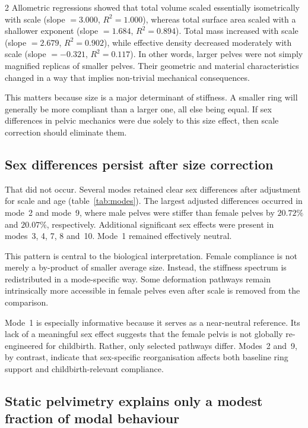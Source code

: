 \documentclass[openacc]{rsproca_new}
\begin{document}
\begin{multicols}{2}
Allometric regressions showed that total volume scaled essentially isometrically with scale (slope $=3.000$, $R^2=1.000$), whereas total surface area scaled with a shallower exponent (slope $=1.684$, $R^2=0.894$). Total mass increased with scale (slope $=2.679$, $R^2=0.902$), while effective density decreased moderately with scale (slope $=-0.321$, $R^2=0.117$). In other words, larger pelves were not simply magnified replicas of smaller pelves. Their geometric and material characteristics changed in a way that implies non-trivial mechanical consequences.

This matters because size is a major determinant of stiffness. A smaller ring will generally be more compliant than a larger one, all else being equal. If sex differences in pelvic mechanics were due solely to this size effect, then scale correction should eliminate them.

\subsection{Sex differences persist after size correction}

That did not occur. Several modes retained clear sex differences after adjustment for scale and age (table~\ref{tab:modes}). The largest adjusted differences occurred in mode~2 and mode~9, where male pelves were stiffer than female pelves by $20.72\%$ and $20.07\%$, respectively. Additional significant sex effects were present in modes~3, 4, 7, 8 and~10. Mode~1 remained effectively neutral.

This pattern is central to the biological interpretation. Female compliance is not merely a by-product of smaller average size. Instead, the stiffness spectrum is redistributed in a mode-specific way. Some deformation pathways remain intrinsically more accessible in female pelves even after scale is removed from the comparison.

Mode~1 is especially informative because it serves as a near-neutral reference. Its lack of a meaningful sex effect suggests that the female pelvis is not globally re-engineered for childbirth. Rather, only selected pathways differ. Modes~2 and~9, by contrast, indicate that sex-specific reorganisation affects both baseline ring support and childbirth-relevant compliance.

\subsection{Static pelvimetry explains only a modest fraction of modal behaviour}


\end{multicols}
\end{document}
